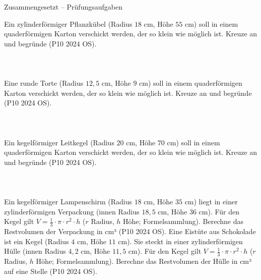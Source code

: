 \begin{aufgabe}{Zusammengesetzt – Prüfungsaufgaben}
\begin{teile}
\teil Ein zylinderförmiger Pflanzkübel (Radius $18$ cm, Höhe $55$ cm) soll in einem quaderförmigen Karton verschickt werden, der so klein wie möglich ist. Kreuze an und begründe \hfill (P10 2024 OS). \\  \\  \\  \\ 
\teil Eine runde Torte (Radius $12{,}5$ cm, Höhe $9$ cm) soll in einem quaderförmigen Karton verschickt werden, der so klein wie möglich ist. Kreuze an und begründe \hfill (P10 2024 OS). \\  \\  \\  \\ 
\teil Ein kegelförmiger Leitkegel (Radius $20$ cm, Höhe $70$ cm) soll in einem quaderförmigen Karton verschickt werden, der so klein wie möglich ist. Kreuze an und begründe \hfill (P10 2024 OS). \\  \\  \\  \\ 
\steil Ein kegelförmiger Lampenschirm (Radius $18$ cm, Höhe $35$ cm) liegt in einer zylinderförmigen Verpackung (innen Radius $18{,}5$ cm, Höhe $36$ cm). Für den Kegel gilt $V = \tfrac{1}{3} \cdot \pi \cdot r^2 \cdot h$ ($r$ Radius, $h$ Höhe; Formelsammlung). Berechne das Restvolumen der Verpackung in cm³ \hfill (P10 2024 OS). \leerfeld[cm³]
\steil Eine Eistüte aus Schokolade ist ein Kegel (Radius $4$ cm, Höhe $11$ cm). Sie steckt in einer zylinderförmigen Hülle (innen Radius $4{,}2$ cm, Höhe $11{,}5$ cm). Für den Kegel gilt $V = \tfrac{1}{3} \cdot \pi \cdot r^2 \cdot h$ ($r$ Radius, $h$ Höhe; Formelsammlung). Berechne das Restvolumen der Hülle in cm³ auf eine Stelle \hfill (P10 2024 OS). \leerfeld[cm³]
\end{teile}
\end{aufgabe}
